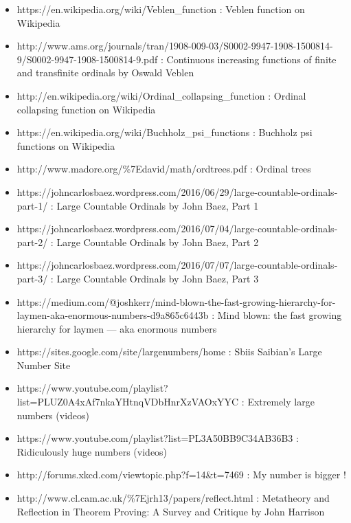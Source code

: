 \documentclass[10pt]{article}
\begin{document}
\begin{itemize}
\item https://en.wikipedia.org/wiki/Veblen\_function : 
Veblen function on Wikipedia

\item http://www.ams.org/journals/tran/1908-009-03/S0002-9947-1908-1500814-9/S0002-9947-1908-1500814-9.pdf : 
Continuous increasing functions of finite and transfinite ordinals by
Oswald Veblen

\item http://en.wikipedia.org/wiki/Ordinal\_collapsing\_function : 
Ordinal collapsing function on Wikipedia

\item https://en.wikipedia.org/wiki/Buchholz\_psi\_functions : 
Buchholz psi functions on Wikipedia

\item http://www.madore.org/\%7Edavid/math/ordtrees.pdf : 
Ordinal trees

\item https://johncarlosbaez.wordpress.com/2016/06/29/large-countable-ordinals-part-1/ : Large Countable Ordinals by John Baez, Part 1
\item https://johncarlosbaez.wordpress.com/2016/07/04/large-countable-ordinals-part-2/ : Large Countable Ordinals by John Baez, Part 2
\item https://johncarlosbaez.wordpress.com/2016/07/07/large-countable-ordinals-part-3/ : Large Countable Ordinals by John Baez, Part 3

\item https://medium.com/@joshkerr/mind-blown-the-fast-growing-hierarchy-for-laymen-aka-enormous-numbers-d9a865c6443b : Mind blown: the fast growing hierarchy for laymen — aka enormous numbers

\item https://sites.google.com/site/largenumbers/home : 
Sbiis Saibian's Large Number Site

\item https://www.youtube.com/playlist?list=PLUZ0A4xAf7nkaYHtnqVDbHnrXzVAOxYYC :
Extremely large numbers (videos) 

\item https://www.youtube.com/playlist?list=PL3A50BB9C34AB36B3 :
Ridiculously huge numbers (videos)

\item http://forums.xkcd.com/viewtopic.php?f=14\&t=7469 : 
My number is bigger !

\item http://www.cl.cam.ac.uk/\%7Ejrh13/papers/reflect.html : 
Metatheory and Reflection in Theorem Proving: A Survey and Critique by John Harrison


\end{itemize}
\end{document}
